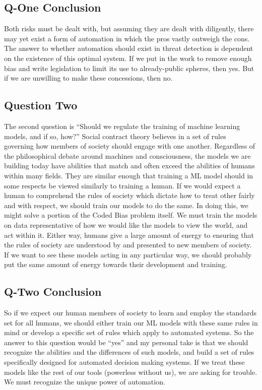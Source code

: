 \documentclass[sigconf, 10pt]{acmart}
\begin{document}
\subsection{Q-One Conclusion}
Both risks must be dealt with, but assuming they are dealt with diligently, there may yet exist a form of automation in which the pros vastly outweigh the cons. The answer to whether automation should exist in threat detection is dependent on the existence of this optimal system. If we put in the work to remove enough bias and write legislation to limit its use to already-public spheres, then yes. But if we are unwilling to make these concessions, then no.
\subsection{Question Two}
The second question is “Should we regulate the training of machine learning models, and if so, how?” Social contract theory believes in a set of rules governing how members of society should engage with one another. Regardless of the philosophical debate around machines and consciousness, the models we are building today have abilities that match and often exceed the abilities of humans within many fields. They are similar enough that training a ML model should in some respects be viewed similarly to training a human. If we would expect a human to comprehend the rules of society which dictate how to treat other fairly and with respect, we should train our models to do the same. In doing this, we might solve a portion of the Coded Bias problem itself. We must train the models on data representative of how we would like the models to view the world, and act within it. Either way, humans give a large amount of energy to ensuring that the rules of society are understood by and presented to new members of society. If we want to see these models acting in any particular way, we should probably put the same amount of energy towards their development and training.
\subsection{Q-Two Conclusion}
So if we expect our human members of society to learn and employ the standards set for all humans, we should either train our ML models with these same rules in mind or develop a specific set of rules which apply to automated systems. So the answer to this question would be “yes” and my personal take is that we should recognize the abilities and the differences of such models, and build a set of rules specifically designed for automated decision making systems. If we treat these models like the rest of our tools (powerless without us), we are asking for trouble. We must recognize the unique power of automation.
\end{document}

